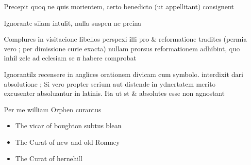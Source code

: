 \documentclass[12pt, a4paper]{book}
\begin{document}
 		
 			
				\marginpar[\vspace{0.5cm}{\textcolor{Gray}{3}}]{}
			
 			
		\ifthenelse{\isodd{\thepage}}
		{\reversemarginpar}
		{\normalmarginpar}
		Precepit quoq ne quis morientem, certo benedicto (ut appellitant) consignent
 			
 		
 			
				\marginpar[\vspace{0.5cm}{\textcolor{Gray}{4}}]{}
			
 			
		\ifthenelse{\isodd{\thepage}}
		{\reversemarginpar}
		{\normalmarginpar}
		Ignorante siiam intulit, nulla suspen ne 
			preina
 		
		
			
				\marginpar[\vspace{0.5cm}{\textcolor{Gray}{5}}]{}
			
			
		\ifthenelse{\isodd{\thepage}}
		{\reversemarginpar}
		{\normalmarginpar}
		Complures in visitacione libellos perspexi illi pro \& reformatione tradites (permia vero ; per dimissione curie exacta) nullam prorsus reformationem adhibint, quo inhil zele ad eclesiam se\sout{ a} habere comprobat
		
 		
 			
				\marginpar[\vspace{0.5cm}{\textcolor{Gray}{6}}]{}
			
 			
		\ifthenelse{\isodd{\thepage}}
		{\reversemarginpar}
		{\normalmarginpar}
		Ignorantilz recensere in anglices orationem divicam cum symbolo. interdixit dari absolutione ; Si vero  propter serium aut distende in ydnertatem merito excusenter absoluantur in latinis. Ita ut st \& absolutes esse non agnostant
 		
 		
		\ifthenelse{\isodd{\thepage}}
		{\reversemarginpar}
		{\normalmarginpar}
		Per me william Orphen curantus
 		
 			\begin{itemize}
 			\item[]The vicar of boughton subtus blean
 			\item[]The Curat of new and old Romney
 			\item[]The Curat of hernehill
 		\end{itemize}
 		


            
\dotfill
					  \subsection*{}
\end{document}
